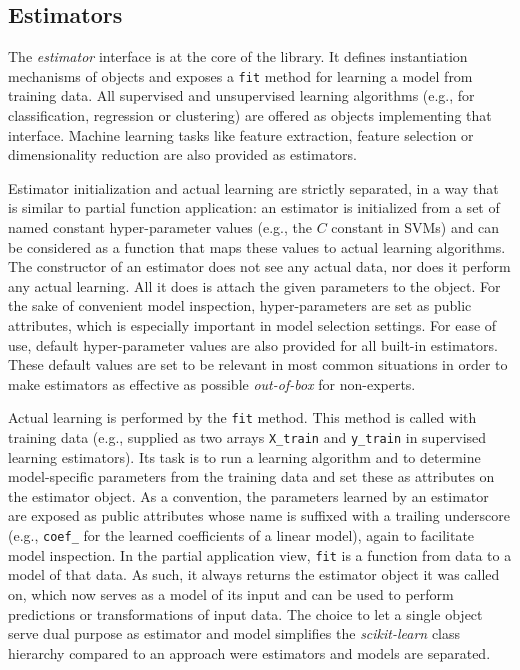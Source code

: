 \documentclass{llncs}
\newcommand{\sklearn}{\textit{scikit-learn}\xspace}
\begin{document}
\subsection{Estimators}
\label{sec:estimators}

The \textit{estimator} interface is at the core of the
library. It defines instantiation mechanisms of objects and exposes a
\texttt{fit} method for learning a model from training data.  All supervised and
unsupervised learning algorithms (e.g., for classification, regression or
clustering) are offered as objects implementing that interface. Machine
learning tasks like feature extraction, feature selection or dimensionality
reduction are also provided as estimators.

Estimator initialization and actual learning are strictly separated,
in a way that is similar to partial function application:
an estimator is initialized from a set of named constant hyper-parameter values
(e.g., the $C$ constant in SVMs)
and can be considered as a function
that maps these values to actual learning algorithms.
The constructor of an estimator does not see any actual data, nor does it perform any actual learning.
All it does is attach the given parameters to the object.
For the sake of convenient model inspection, hyper-parameters are set as public attributes,
which is especially important in model selection settings.
For ease of use, default hyper-parameter values are also provided
for all built-in estimators.
These default values are set to be relevant in most common
situations in order to make estimators as effective as possible
\textit{out-of-box} for non-experts.

Actual learning is performed by the \texttt{fit} method. This method is called
with training data (e.g., supplied as two arrays \texttt{X\_train} and
\texttt{y\_train} in supervised learning estimators). Its task is to run a
learning algorithm and to determine model-specific parameters from the training
data and set these as attributes on the estimator object. As a convention, the
parameters learned by an estimator are exposed as public attributes whose name
is suffixed with a trailing underscore (e.g., \texttt{coef\_} for the
learned coefficients of a linear model),
again to facilitate model inspection.
In the partial application view,
\texttt{fit} is a function from data to a model of that data.
As such, it always returns the estimator object it was called on,
which now serves as a model of its input and can be used to perform predictions or transformations of input data.
The choice to let a single object serve dual purpose as estimator and model
simplifies the \sklearn class hierarchy
compared to an approach were estimators and models are separated.
\end{document}

